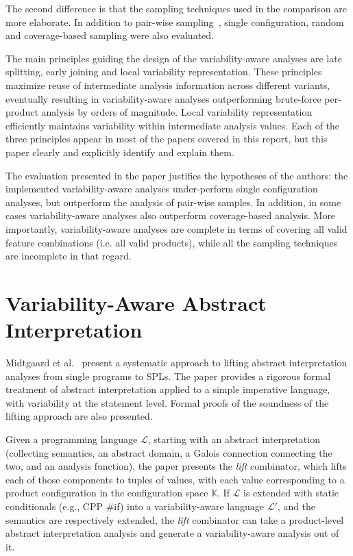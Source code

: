\documentclass[11pt]{article}
\newcommand{\term}[1] {\emph{#1}}
\begin{document}
The second difference is that the sampling techniques used in the comparison are more elaborate. In addition to pair-wise sampling~\cite{Apel:2013}, single configuration, random and coverage-based sampling were also evaluated.

The main principles guiding the design of the variability-aware analyses are late splitting, early joining and local variability representation. These principles maximize reuse of intermediate analysis information across different variants, eventually resulting in variability-aware analyses outperforming brute-force per-product analysis by orders of magnitude. Local variability representation efficiently maintains variability within intermediate analysis values. Each of the three principles appear in most of the papers covered in this report, but this paper clearly and explicitly identify and explain them.

The evaluation presented in the paper justifies the hypotheses of the authors: the implemented variability-aware analyses under-perform single configuration analyses, but outperform the analysis of pair-wise samples. In addition, in some cases variability-aware analyses also outperform coverage-based analysis. More importantly, variability-aware analyses are complete in terms of covering all valid feature combinations (i.e. all valid products), while all the sampling techniques are incomplete in that regard.

\section{Variability-Aware Abstract Interpretation}

\newcommand{\configSpace}{\mathbb{K}}
\newcommand{\featSpace}{\mathbb{F}}
\newcommand{\lang}{\mathcal{L}}

Midtgaard et al.~\cite{Midtgaard:2015} present a systematic approach to lifting abstract interpretation analyses from single programs to SPLs. The paper provides a rigorous formal treatment of abstract interpretation applied to a simple imperative language, with variability at the statement level. Formal proofs of the soundness of the lifting approach are also presented. 

Given a programming language $\lang$, starting with an abstract interpretation (collecting semantics, an abstract domain, a Galois connection connecting the two, and an analysis function), the paper presents the \term{lift} combinator, which lifts each of those components to tuples of values, with each value corresponding to a product configuration in the configuration space $\configSpace$. If $\lang$ is extended with static conditionals (e.g., CPP \#if) into a variability-aware language  $\lang'$, and the semantics are respectively extended, the \term{lift} combinator can take a product-level abstract interpretation analysis and generate a variability-aware analysis out of it. 
\end{document}

